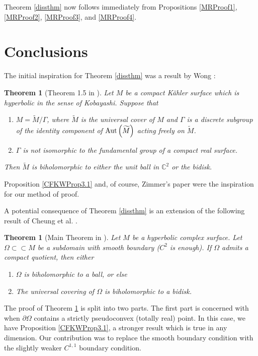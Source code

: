 \documentclass[12pt]{article}
\newcommand{\C}{\mathbb{C}}
\newcommand{\Aut}{\textup{Aut}}
\newtheorem{theorem}[lemma]{Theorem}
\begin{document}
Theorem \ref{dissthm} now follows immediately from Propositions \ref{MRProof1}, \ref{MRProof2}, \ref{MRProof3}, and \ref{MRProof4}.


\section{Conclusions}
\label{ConclusionSec}

The initial inspiration for Theorem \ref{dissthm} was a result by Wong \cite{Wong81}:

\begin{theorem}[Theorem 1.5 in \cite{Wong81}]
\label{WongUni}
Let $M$ be a compact K\"ahler surface which is hyperbolic in the sense of Kobayashi. Suppose that 
\begin{enumerate}[label=\textup{(\arabic*)}]
    \item $M=\widetilde{M}/\Gamma$, where $\widetilde{M}$ is the universal cover of $M$ and $\Gamma$ is a discrete subgroup of the identity component of $\Aut\left(\widetilde{M}\right)$ acting freely on $\widetilde{M}$.
    \item $\Gamma$ is not isomorphic to the fundamental group of a compact real surface.
\end{enumerate}
Then $\widetilde{M}$ is biholomorphic to either the unit ball in $\C^2$ or the bidisk.
\end{theorem}

Proposition \ref{CFKWProp3.1} and, of course, Zimmer's paper \cite{Zimmer} were the inspiration for our method of proof.

A potential consequence of Theorem \ref{dissthm} is an extension of the following result of Cheung et al. \cite{CFKW}.

\begin{theorem}[Main Theorem in \cite{CFKW}]
\label{CFKWmain}
Let $M$ be a hyperbolic complex surface. Let $\Omega\subset\subset M$ be a subdomain with smooth boundary ($C^2$ is enough). If $\Omega$ admits a compact quotient, then either
\begin{enumerate}
    \item $\Omega$ is biholomorphic to a ball, or else
    \item The universal covering of $\Omega$ is biholomorphic to a bidisk.
\end{enumerate}
\end{theorem}

The proof of Theorem \ref{CFKWmain} is split into two parts. The first part is concerned with when $\partial\Omega$ contains a strictly pseudoconvex (totally real) point. In this case, we have Proposition \ref{CFKWProp3.1}, a stronger result which is true in any dimension. Our contribution was to replace the smooth boundary condition with the slightly weaker $C^{1,1}$ boundary condition.
\end{document}
